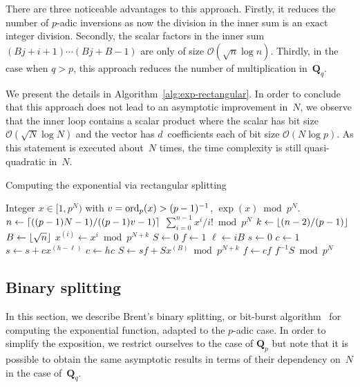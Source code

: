 There are three noticeable advantages to this approach.  Firstly, it 
reduces the number of $p$-adic inversions as now the division in the 
inner sum is an exact integer division.  Secondly, the scalar factors 
in the inner sum $(B j + i + 1) \dotsm (B j + B - 1)$ are only of size 
$\mathcal{O}(\sqrt{n} \log n)$.  Thirdly, in the case when $q > p$, 
this approach reduces the number of multiplication in~$\mathbf{Q}_q$.

We present the details in Algorithm~\ref{alg:exp-rectangular}.  In order 
to conclude that this approach does not lead to an asymptotic improvement 
in~$N$, we observe that the inner loop contains a scalar product where the 
scalar has bit size $\mathcal{O}(\sqrt{N} \log N)$ and the 
vector has $d$~coefficients each of bit size $\mathcal{O}(N \log p)$.  
As this statement is executed about~$N$ times, the time complexity is still 
quasi-quadratic in~$N$.

\begin{algorithm}
\caption{Computing the exponential via rectangular splitting}
\label{alg:exp-rectangular}
\begin{algorithmic}
\vspace{1mm}
\Require Integer $x \in [1,p^N)$ with $v = \operatorname{ord}_p(x) > (p-1)^{-1}$,
\Ensure  $\exp(x) \bmod{p^N}$.
\State $n \gets \left\lceil((p-1)N - 1) / ((p-1)v - 1)\right\rceil$
\Return $\sum_{i=0}^{n-1} x^i / i! \bmod{p^N}$
\Else
\State $k \gets \left\lfloor(n-2)/(p-1)\right\rfloor$
\State $B \gets \left\lfloor\sqrt{n}\right\rfloor$
\State $x^{(i)} \gets x^i \bmod {p^{N + k}}$
\EndFor
\State $S \gets 0$
\State $f \gets 1$
\State $\ell \gets i B$
\State $s \gets 0$
\State $c \gets 1$
\State $s \gets s + c x^{(h-\ell)}$
\State $c \gets h c$
\EndIf
\EndFor
\State $S \gets s f + S x^{(B)} \bmod{p^{N + k}}$
\State $f \gets c f$
\EndFor
\Return $f^{-1} S \bmod {p^N}$
\EndIf
\EndProcedure
\end{algorithmic}
\end{algorithm}

\subsection{Binary splitting}

In this section, we describe Brent's binary splitting, or bit-burst 
algorithm~\citep{Brent1976} for computing the exponential function, 
adapted to the $p$-adic case.  In order to simplify the exposition, 
we restrict ourselves to the case of $\mathbf{Q}_p$ but note that 
it is possible to obtain the same asymptotic results in terms of 
their dependency on~$N$ in the case of~$\mathbf{Q}_q$.

